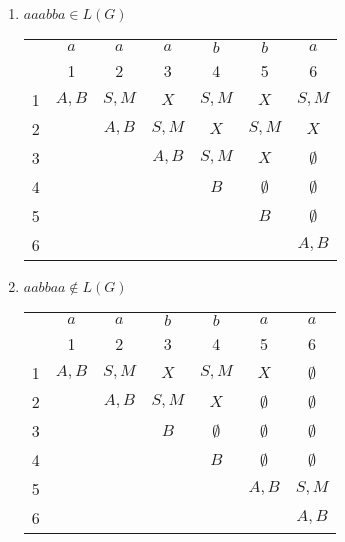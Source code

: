 \documentclass{article}
\begin{document}
	\begin{enumerate}[label=(\alph*)]
		\item $aaabba\in L(G)$
		\begin{center}
			\begin{tabular}{c|cccccc}
				& $a$ & $a$ & $a$ & $b$ & $b$ & $a$ \\
				& 1 & 2 & 3 & 4 & 5 & 6 \\
				\hline
				1 & $A,B$ & $S,M$ & $X$ & $S,M$ & $X$ & $S,M$ \\
				2 & & $A,B$ & $S,M$ & $X$ & $S,M$ & $X$ \\
				3 & & & $A,B$ & $S,M$ & $X$ & $\emptyset$ \\
				4 & & & & $B$ & $\emptyset$ & $\emptyset$ \\
				5 & & & & & $B$ & $\emptyset$ \\
				6 & & & & & & $A,B$
			\end{tabular}
		\end{center}
		\item $aabbaa\notin L(G)$
		\begin{center}
			\begin{tabular}{c|cccccc}
				& $a$ & $a$ & $b$ & $b$ & $a$ & $a$ \\
				& 1 & 2 & 3 & 4 & 5 & 6 \\
				\hline
				1 & $A,B$ & $S,M$ & $X$ & $S,M$ & $X$ & $\emptyset$ \\
				2 & & $A,B$ & $S,M$ & $X$ & $\emptyset$ & $\emptyset$ \\
				3 & & & $B$ & $\emptyset$ & $\emptyset$ & $\emptyset$ \\
				4 & & & & $B$ & $\emptyset$ & $\emptyset$ \\
				5 & & & & & $A,B$ & $S,M$ \\
				6 & & & & & & $A,B$
			\end{tabular}
		\end{center}
	\end{enumerate}
\end{document}
